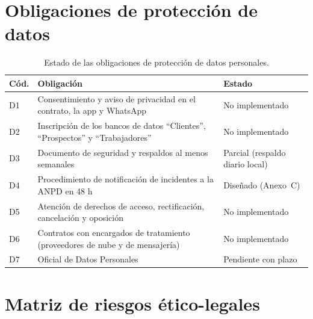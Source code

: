\section{Obligaciones de protección de datos}

\begin{table}[H]
\centering
\caption{Estado de las obligaciones de protección de datos personales.}
\label{tab:anx-etica-datos}
\small
\begin{tabularx}{\textwidth}{L{0.7cm}XL{3.4cm}}
\toprule
\textbf{Cód.} & \textbf{Obligación} & \textbf{Estado} \\
\midrule
D1 & Consentimiento y aviso de privacidad en el contrato, la app y WhatsApp & No implementado \\
D2 & Inscripción de los bancos de datos ``Clientes'', ``Prospectos'' y ``Trabajadores'' & No implementado \\
D3 & Documento de seguridad y respaldos al menos semanales & Parcial (respaldo diario local) \\
D4 & Procedimiento de notificación de incidentes a la ANPD en 48 h & Diseñado (Anexo~C) \\
D5 & Atención de derechos de acceso, rectificación, cancelación y oposición & No implementado \\
D6 & Contratos con encargados de tratamiento (proveedores de nube y de mensajería) & No implementado \\
D7 & Oficial de Datos Personales & Pendiente con plazo \\
\bottomrule
\end{tabularx}
\end{table}

\section{Matriz de riesgos ético-legales}

